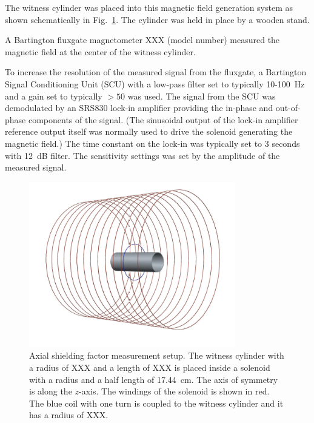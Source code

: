 The witness cylinder was placed into this magnetic field generation
system as shown schematically in Fig.~\ref{fig:geometry}.  The
cylinder was held in place by a wooden stand.

A Bartington fluxgate magnetometer XXX (model number) measured the
magnetic field at the center of the witness cylinder.




To increase the resolution of the measured signal from the fluxgate, a
Bartington Signal Conditioning Unit (SCU) with a low-pass filter set
to typically 10-100~Hz and a gain set to typically $>50$ was used.
The signal from the SCU was demodulated by an SRS830 lock-in amplifier
providing the in-phase and out-of-phase components of the signal.
(The sinusoidal output of the lock-in amplifier reference output
itself was normally used to drive the solenoid generating the magnetic
field.)  The time constant on the lock-in was typically set to 3
seconds with 12~dB filter. The sensitivity settings was set by the
amplitude of the measured signal.

\begin{figure}[h!]
\begin{center}
   \includegraphics[width=0.8\textwidth]{geometry.PNG}
    \caption{Axial shielding factor measurement setup. The witness
      cylinder with a radius of XXX and a length of XXX is placed
      inside a solenoid with a radius and a half length of
      17.44~cm. The axis of symmetry is along the $z$-axis. The
      windings of the solenoid is shown in red. The blue coil with one
      turn is coupled to the witness cylinder and it has a radius of
      XXX.  }
    \label{fig:geometry}
    \end{center}
\end{figure}


